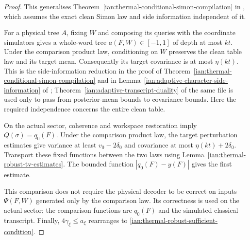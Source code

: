\begin{proof}
This generalises
Theorem~\ref{ian:thermal-conditional-simon-compilation} in
, which assumes the exact clean
Simon law and side information independent of it.

For a physical tree \(A\), fixing \(W\) and composing its queries with
the coordinate simulators gives a whole-word tree
\(a(F,W)\in[-1,1]\) of depth at most \(kt\).
Under the comparison product law, conditioning on \(W\) preserves
the clean table law and its target mean. Consequently its target
covariance is at most \(\eta(kt)\). This is the side-information
reduction in the proof of
Theorem~\ref{ian:thermal-conditional-simon-compilation} and in
Lemma~\ref{ian:adaptive-character-side-information} of
;
Theorem~\ref{ian:adaptive-transcript-duality} of the same file is used
only to pass from posterior-mean bounds to covariance bounds. Here the
required independence concerns the entire clean table.

On the actual sector, coherence and workspace restoration imply
\(Q(\sigma)=q_0(F)\). Under the comparison product law,
the target perturbation estimates give variance at least
\(v_0-2\delta_0\) and covariance at most
\(\eta(kt)+2\delta_0\).
Transport these fixed functions between the two laws using
Lemma~\ref{ian:thermal-robust-tv-estimates}.
The bounded function \(|q_0(F)-y(F)|\) gives the first estimate.

This comparison does not require the physical decoder to be correct
on inputs \(\Psi(F,W)\) generated only by the comparison law.
Its correctness is used on the actual sector; the comparison
functions are \(q_0(F)\) and the simulated classical transcript.
Finally, \(4\gamma_\xi\le a_\xi\) rearranges to
\eqref{ian:thermal-robust-sufficient-condition}.
\end{proof}

